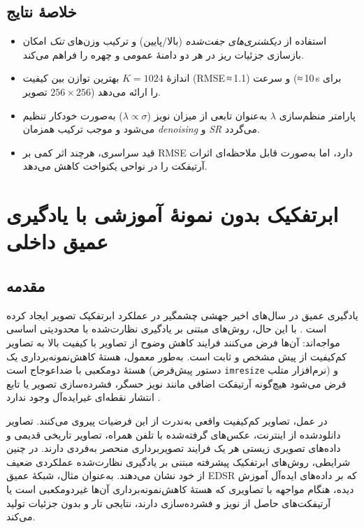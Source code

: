 	\subsection{خلاصهٔ نتایج}
	\begin{itemize}
		\item استفاده از \textit{دیکشنری‌های جفت‌شده} (بالا/پایین) و ترکیب وزن‌های \textit{تنک} امکان بازسازی جزئیات ریز در هر دو دامنهٔ عمومی و چهره را فراهم می‌کند.
		\item اندازهٔ $K=1024$ بهترین توازن بین کیفیت (RMSE ≈ 1.1) و سرعت (≈ 10 s برای تصویر $256\times256$) را ارائه می‌دهد.
		\item پارامتر منظم‌سازی $\lambda$ به‌عنوان تابعی از میزان نویز ($\lambda\propto\sigma$) به‌صورت خودکار تنظیم می‌شود و موجب ترکیب همزمان \textit{denoising} و \textit{SR} می‌گردد.
		\item قید سراسری، هرچند اثر کمی بر RMSE دارد، اما به‌صورت قابل ملاحظه‌ای اثرات آرتیفکت را در نواحی یکنواخت کاهش می‌دهد.
	\end{itemize}

\section{ابرتفکیک بدون نمونهٔ آموزشی با یادگیری عمیق داخلی}
\label{sec:zssr}

\subsection{مقدمه}
\label{subsec:zssr_intro}

یادگیری عمیق در سال‌های اخیر جهشی چشمگیر در عملکرد ابرتفکیک تصویر
ایجاد کرده است \cite{lim2017enhanceddeepresidualnetworks, wang2018esrganenhancedsuperresolutiongenerative}.
با این حال، روش‌های مبتنی بر یادگیری نظارت‌شده با محدودیتی اساسی
مواجه‌اند: آن‌ها فرض می‌کنند فرایند کاهش وضوح از تصاویر با کیفیت بالا
به تصاویر کم‌کیفیت
از پیش مشخص و ثابت است. به‌طور معمول، هستهٔ
کاهش‌نمونه‌برداری یک هستهٔ دومکعبی
با ضد‌اعوجاج است (دستور پیش‌فرض \texttt{imresize} نرم‌افزار متلب)
و فرض می‌شود هیچ‌گونه آرتیفکت اضافی مانند نویز حسگر، فشرده‌سازی تصویر
یا تابع انتشار نقطه‌ای غیرایده‌آل
وجود ندارد \cite{shocher2018zssr}.

در عمل، تصاویر کم‌کیفیت واقعی به‌ندرت از این فرضیات پیروی می‌کنند.
تصاویر دانلود‌شده از اینترنت، عکس‌های گرفته‌شده با تلفن همراه، تصاویر
تاریخی قدیمی و داده‌های تصویری زیستی هر یک فرایند تصویربرداری منحصر
به‌فردی دارند. در چنین شرایطی، روش‌های ابرتفکیک پیشرفته مبتنی بر
یادگیری نظارت‌شده عملکردی ضعیف از خود نشان می‌دهند. به‌عنوان مثال،
شبکهٔ عمیق EDSR \cite{lim2017enhanceddeepresidualnetworks} که بر داده‌های ایده‌آل آموزش دیده،
هنگام مواجهه با تصاویری که هستهٔ کاهش‌نمونه‌برداری آن‌ها غیردومکعبی
است یا آرتیفکت‌های حاصل از نویز و فشرده‌سازی دارند، نتایجی تار و
بدون جزئیات تولید می‌کند.

